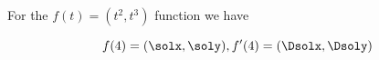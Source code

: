 For the $f(t)=(t^2,t^3)$ function we have
\VECTORfunction
    {\SQUAREfunction}{\CUBEfunction}{\F}


\[
f(4)=(\solx,\soly), f'(4)=(\Dsolx,\Dsoly)
\]
